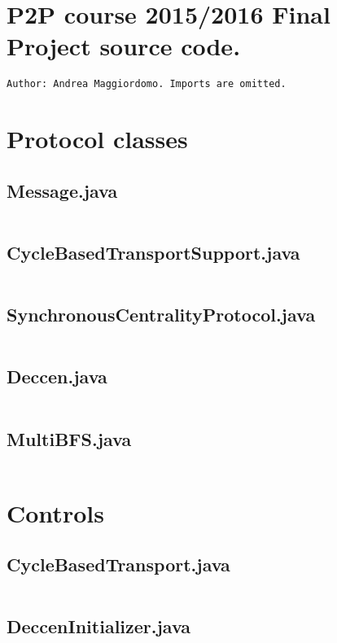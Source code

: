 \documentclass[a4paper, 10pt]{article}
\begin{document}
\section*{P2P course 2015/2016 Final Project source code.}
\begin{verbatim}
Author: Andrea Maggiordomo. Imports are omitted.
\end{verbatim}
\section{Protocol classes}
\subsection*{Message.java}
\inputminted[firstline=16]{java}{../src/centrality/Message.java}
\subsection*{CycleBasedTransportSupport.java}
\inputminted[firstline=13]{java}{../src/centrality/CycleBasedTransportSupport.java}
\subsection*{SynchronousCentralityProtocol.java}
\inputminted[firstline=18]{java}{../src/centrality/SynchronousCentralityProtocol.java}
\subsection*{Deccen.java}
\inputminted[firstline=24]{java}{../src/centrality/Deccen.java}
\subsection*{MultiBFS.java}
\inputminted[firstline=25]{java}{../src/centrality/MultiBFS.java}

\section{Controls}

\subsection*{CycleBasedTransport.java}
\inputminted[firstline=19]{java}{../src/centrality/CycleBasedTransport.java}
\subsection*{DeccenInitializer.java}
\inputminted[firstline=16]{java}{../src/centrality/DeccenInitializer.java}
\end{document}
